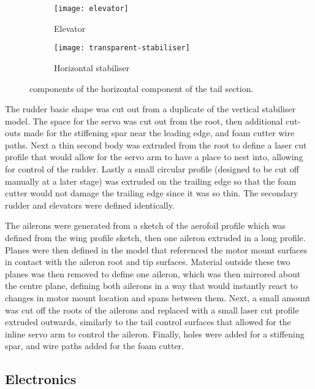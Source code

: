 \documentclass[../../main.tex]{subfiles}
\begin{document}
\begin{figure}[H]

    \centering
    \begin{subfigure}[b]{0.49\columnwidth}
        \centering
        \texttt{[image: elevator]}
        \caption{Elevator}
        \label{fig:tail-assembly:elevator}
    \end{subfigure}
    \hfill
    \begin{subfigure}[b]{0.49\columnwidth}
        \centering
        \texttt{[image: transparent-stabiliser]}
        \caption{Horizontal stabiliser}
        \label{fig:tail-assembly:horizontal-stabiliser}
    \end{subfigure}
    
    \caption{components of the horizontal component of the tail section.}
    \label{fig:tail-assembly}
\end{figure} 

The rudder basic shape was cut out from a duplicate of the vertical stabiliser model.
The space for the servo was cut out from the root, then additional cut-outs made for the stiffening spar near the leading edge, and foam cutter wire paths.
Next a thin second body was extruded from the root to define a laser cut profile that would allow for the servo arm to have a place to nest into, allowing for control of the rudder.
Lastly a small circular profile (designed to be cut off manually at a later stage) was extruded on the trailing edge so that the foam cutter would not damage the trailing edge since it was so thin.
The secondary rudder and elevators were defined identically. 

The ailerons were generated from a sketch of the aerofoil profile which was defined from the wing profile sketch, then one aileron extruded in a long profile.
Planes were then defined in the model that referenced the motor mount surfaces in contact with the aileron root and tip surfaces.
Material outside these two planes was then removed to define one aileron, which was then mirrored about the centre plane, defining both ailerons in a way that would instantly react to changes in motor mount location and spans between them.
Next, a small amount was cut off the roots of the ailerons and replaced with a small laser cut profile extruded outwards, similarly to the tail control surfaces that allowed for the inline servo arm to control the aileron.
Finally, holes were added for a stiffening spar, and wire paths added for the foam cutter. 

\subsection{Electronics} \label{sec:design-process:revised-design:electronics}
\end{document}
